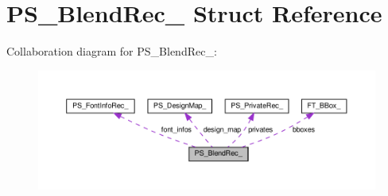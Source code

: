 \hypertarget{structPS__BlendRec__}{}\section{P\+S\+\_\+\+Blend\+Rec\+\_\+ Struct Reference}
\label{structPS__BlendRec__}


Collaboration diagram for P\+S\+\_\+\+Blend\+Rec\+\_\+\+:
\nopagebreak
\begin{figure}[H]
\begin{center}
\leavevmode
\includegraphics[width=350pt]{structPS__BlendRec____coll__graph}
\end{center}
\end{figure}
